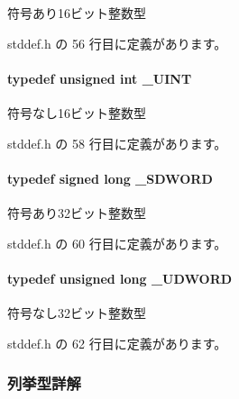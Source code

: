 符号あり16ビット整数型 



 stddef.\+h の 56 行目に定義があります。

\paragraph[{\+\_\+\+U\+I\+N\+T}]{\setlength{\rightskip}{0pt plus 5cm}typedef unsigned int {\bf \+\_\+\+U\+I\+N\+T}}\label{stddef_8h_af1d4b529b856acadd9e1b43f5d794d24_af1d4b529b856acadd9e1b43f5d794d24}


符号なし16ビット整数型 



 stddef.\+h の 58 行目に定義があります。

\paragraph[{\+\_\+\+S\+D\+W\+O\+R\+D}]{\setlength{\rightskip}{0pt plus 5cm}typedef signed long {\bf \+\_\+\+S\+D\+W\+O\+R\+D}}\label{stddef_8h_a931e4fd9bf350284fc21e94cd5ee126f_a931e4fd9bf350284fc21e94cd5ee126f}


符号あり32ビット整数型 



 stddef.\+h の 60 行目に定義があります。

\paragraph[{\+\_\+\+U\+D\+W\+O\+R\+D}]{\setlength{\rightskip}{0pt plus 5cm}typedef unsigned long {\bf \+\_\+\+U\+D\+W\+O\+R\+D}}\label{stddef_8h_a1fd04328ad1e5a3e83788b99cddc35dd_a1fd04328ad1e5a3e83788b99cddc35dd}


符号なし32ビット整数型 



 stddef.\+h の 62 行目に定義があります。



\subsubsection{列挙型詳解}

